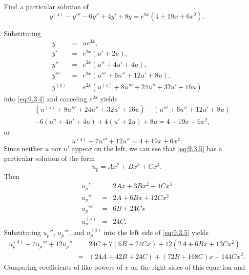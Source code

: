 \begin{example}
  \label{example:9.3.2} \rm Find a particular solution of
  \begin{equation}
    \label{eq:9.3.4}y^{(4)}-y'''-6y''+4y'+8y=e^{2x}(4+19x+6x^{2}).
  \end{equation}
\end{example}

\begin{examplesolution}
\solution Substituting
\begin{eqnarray*}
  y       & = & ue^{2x},                   \\
  y'      & = & e^{2x}(u'+2u),             \\
  y''     & = & e^{2x}(u''+4u'+4u),        \\
  y'''    & = & e^{2x}(u'''+6u''+12u'+8u), \\
  y^{(4)} & = & e^{2x}(u^{(4)}+8u'''+24u''+32u'+16u)
\end{eqnarray*}
into \eqref{eq:9.3.4} and canceling $e^{2x}$ yields
\begin{eqnarray*}
   &  & (u^{(4)}+8u'''+24u''+32u'+16u)-(u'''+6u''+12u'+8u) \\
   &  & -6(u''+4u'+4u)+4(u'+2u)+8u=4+19x+6x^{2},
\end{eqnarray*}
or
\begin{equation}
  \label{eq:9.3.5}u^{(4)}+7u'''+12u''=4+19x+6x^{2}.
\end{equation}
Since neither $u$ nor $u'$ appear on the left, we can see that \eqref{eq:9.3.5} has a particular
solution of the form
\begin{equation}
  \label{eq:9.3.6}u_{p}=Ax^{2}+Bx^{3}+Cx^{4}.
\end{equation}
Then
\begin{eqnarray*}
  u_{p}'      & = & 2Ax+3Bx^{2}+4Cx^{3} \\
  u_{p}''     & = & 2A+6Bx+12Cx^{2}     \\
  u_{p}'''    & = & 6B+24Cx             \\
  u_{p}^{(4)} & = & 24C.
\end{eqnarray*}
Substituting $u_{p}''$, $u_{p}'''$, and $u_{p}^{(4)}$ into the left side of \eqref{eq:9.3.5} yields
\begin{eqnarray*}
  u_{p}^{(4)}+7u_{p}'''+12u_{p}'' & = & 24C+7(6B+24Cx)+12(2A+6Bx+12Cx^{2}) \\
                                  & = & (24A+42B+24C)+(72B+168C)x+144Cx^{2}.
\end{eqnarray*}
Comparing coefficients of like powers of $x$ on the right sides of this equation and

\end{examplesolution}
